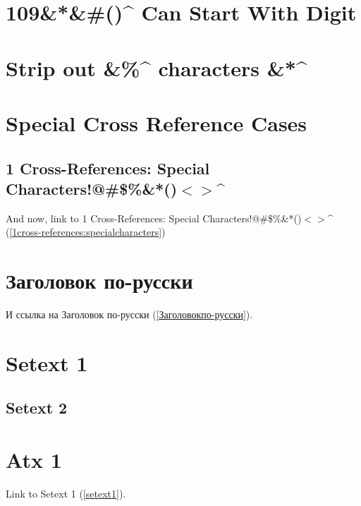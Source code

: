 
\def\mytitle{MultiMarkdown Autoreference Test}


\chapter{109\&*\&\#()\^{} Can Start With Digit}
\label{109canstartwithdigit}

\chapter{Strip out \&\%\^{} characters \&*\^{}}
\label{stripoutcharacters}

\chapter{Special Cross Reference Cases}
\label{specialcrossreferencecases}

\section{1 Cross-{}References: Special Characters!@\#\$\%\&*()$<$$>$\^{}}
\label{1cross-references:specialcharacters}

And now, link to 1 Cross-{}References: Special Characters!@\#\$\%\&*()$<$$>$\^{} (\autoref{1cross-references:specialcharacters})

\chapter{Заголовок по-{}русски}
\label{Заголовокпо-русски}

И ссылка на Заголовок по-{}русски (\autoref{Заголовокпо-русски}).

\chapter{Setext 1}
\label{setext1}

\section{Setext 2}
\label{setext2}

\chapter{Atx 1}
\label{atx1}

Link to Setext 1 (\autoref{setext1}).

